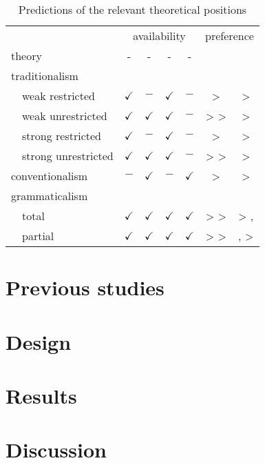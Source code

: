 \documentclass[fleqn,reqno,10pt,draft]{article}
\newcommand{\lit}{\acro{lit}}
\newcommand{\glb}{\acro{glb}}
\newcommand{\loc}{\acro{loc}}
\newcommand{\as}{\acro{as}}
\renewcommand{\es}{\acro{es}}
\begin{document}
\begin{table}[t]
  \centering
  \begin{tabular}{lcccccc}
    & \multicolumn{4}{c}{availability} 
    & \multicolumn{2}{c}{preference}
    \\ \cmidrule(r){2-5}  \cmidrule(r){6-7}
    theory
    & \as-\glb
    & \as-\loc
    & \es-\glb
    & \es-\loc
    & \as
    & \es
    \\ \midrule
    traditionalism
    \\
    \ \ weak restricted 
    & $\checkmark$
    & $-$
    & $\checkmark$
    & $-$
    & \lit > \glb 
    & \lit > \glb
    \\
    \ \ weak unrestricted
    & $\checkmark$
    & $\checkmark$
    & $\checkmark$
    & $-$
    & \lit > \glb > \loc 
    & \lit > \glb
    \\
    \ \ strong restricted
    & $\checkmark$
    & $-$
    & $\checkmark$
    & $-$
    & \glb > \lit 
    & \glb > \lit
    \\
    \ \ strong unrestricted
    & $\checkmark$
    & $\checkmark$
    & $\checkmark$
    & $-$
    & \glb > \loc > \lit 
    & \glb > \lit
    \\
    conventionalism
    & $-$
    & $\checkmark$
    & $-$
    & $\checkmark$
    & \loc >  \lit 
    & \loc >  \lit
    \\
    grammaticalism
    \\
    \ \ total
    & $\checkmark$
    & $\checkmark$
    & $\checkmark$
    & $\checkmark$
    & \loc > \glb > \lit 
    & \glb > \lit, \loc
    \\
    \ \ partial
    & $\checkmark$
    & $\checkmark$
    & $\checkmark$
    & $\checkmark$
    & \loc > \glb > \lit 
    & \glb, \loc >  \lit
    \\

  \end{tabular}
  \caption{Predictions of the relevant theoretical positions}
  \label{tab:predictions}
\end{table}

\newpage

\section{Previous studies}
\label{sec:previous-studies}

\lipsum[1]

\section{Design}
\label{sec:design}

\lipsum[1]

\section{Results}
\label{sec:results}

\lipsum[1]

\section{Discussion}
\label{sec:discussion}

\lipsum[1]





\printbibliography[heading=bibintoc]
\end{document}
